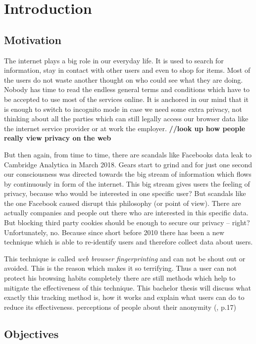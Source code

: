 \chapter{Introduction}
\label{cha:Introduction}

\section{Motivation}

The internet plays a big role in our everyday life. It is used to search for information, stay in contact with other users and even to shop for items. Most of the users do not waste another thought on who could see what they are doing. Nobody has time to read the endless general terms and conditions which have to be accepted to use most of the services online. It is anchored in our mind that it is enough to switch to incognito mode in case we need some extra privacy, not thinking about all the parties which can still legally access our browser data like the internet service provider or at work the employer.
\textbf{//look up how people really view privacy on the web}

But then again, from time to time, there are scandals like Facebooks data leak to Cambridge Analytica in March 2018. Gears start to grind and for just one second our consciousness was directed towards the big stream of information which flows by continuously in form of the internet. This big stream gives users the feeling of privacy, because who would be interested in one specific user? But scandals like the one Facebook caused disrupt this philosophy (or point of view). There are actually companies and people out there who are interested in this specific data. But blocking third party cookies should be enough to secure our privacy – right? Unfortunately, no. Because since short before 2010 there has been a new technique which is able to re-identify users and therefore collect data about users. 

This technique is called \textit{web browser fingerprinting} and can not be shout out or avoided. This is the reason which makes it so terrifying. Thus a user can not protect his browsing habits completely there are still methods which help to mitigate the effectiveness of this technique.
This bachelor thesis will discuss what exactly this tracking method is, how it works and explain what users can do to reduce its effectiveness. 
perceptions of people about their anonymity
(\textcite{mayer09}, p.17)

\newpage
\section{Objectives}
